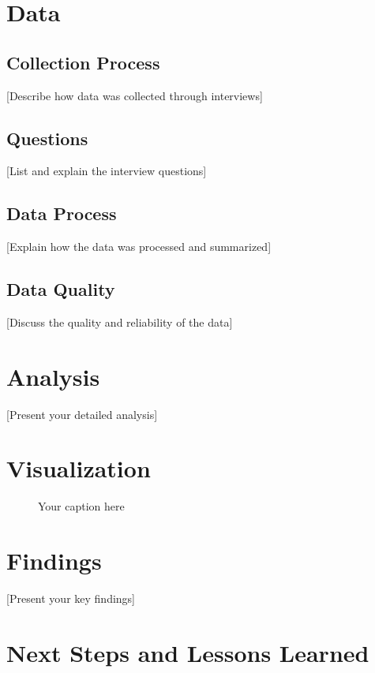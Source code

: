 \documentclass[12pt,a4paper]{article}
\begin{document}
\section{Data}
\subsection{Collection Process}
[Describe how data was collected through interviews]

\subsection{Questions}
[List and explain the interview questions]

\subsection{Data Process}
[Explain how the data was processed and summarized]

\subsection{Data Quality}
[Discuss the quality and reliability of the data]

\section{Analysis}
[Present your detailed analysis]

\section{Visualization}
\begin{figure}[H]
    \centering
    \caption{Your caption here}
    \label{fig:your-label}
\end{figure}

\section{Findings}
[Present your key findings]

\section{Next Steps and Lessons Learned}
\end{document}
